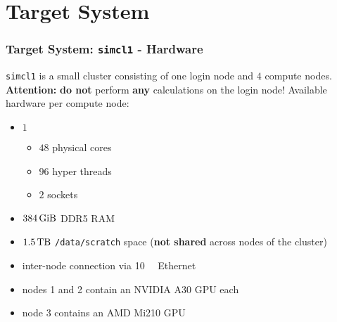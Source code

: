 \section{Target System}
\begin{frame}
  \frametitle{Target System: \texttt{simcl1} - Hardware}
  \texttt{simcl1} is a small cluster consisting of one login node and $\num{4}$ compute nodes. \\
  \textbf{Attention:} \textbf{do not} perform \textbf{any} calculations on the login node!
  \vfill
  Available hardware per compute node:
  \begin{itemize}
      \item $\num{1}$ 
      \begin{itemize}
          \item $\num{48}$ physical cores
          \item $\num{96}$ hyper threads
          \item $\num{2}$ sockets
      \end{itemize}
      \item $\SI{384}{\gibi\byte}$ DDR5 RAM
      \item $\SI{1.5}{\tera\byte}$ \texttt{/data/scratch} space (\textbf{not shared} across nodes of the cluster)\\
      \item inter-node connection via \SI{10}{\giga\byte} Ethernet
      \item nodes 1 and 2 contain an NVIDIA A30 GPU each
      \item node 3 contains an AMD Mi210 GPU
  \end{itemize}
\end{frame}

